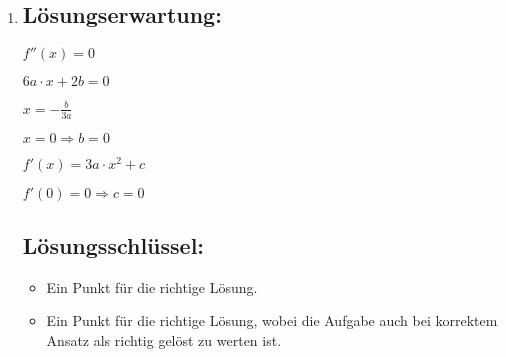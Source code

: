 \begin{langesbeispiel}
{\begin{enumerate}
	\subsection{Lösungsschlüssel:}
	
\begin{itemize}
	\item Ein Punkt für die Angabe der beiden korrekten Werte.
	\item Ein Punkt für die richtige Lösung und eine korrekte Begründung.  
\end{itemize}

	\item \subsection{Lösungserwartung:}
			
	$f''(x)=0$
	
	$6a\cdot x+2b=0$
	
	$x=-\frac{b}{3a}$
	
	$x=0 \Rightarrow b=0$\leer
	
	$f'(x)=3a\cdot x^2+c$
	
	$f'(0)=0 \Rightarrow c=0$
	
	\subsection{Lösungsschlüssel:}
	
\begin{itemize}
	\item Ein Punkt für die richtige Lösung.
	\item Ein Punkt für die richtige Lösung, wobei die Aufgabe auch bei korrektem Ansatz als richtig gelöst zu werten ist.  
\end{itemize}

\end{enumerate}}
		\end{langesbeispiel}